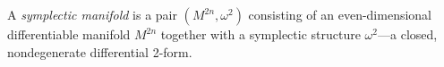 A \textit{symplectic manifold} is a pair $(M^{2n}, \omega^2)$ consisting of an even-dimensional differentiable manifold $M^{2n}$ together with a symplectic structure $\omega^2$—a closed, nondegenerate differential 2-form.
